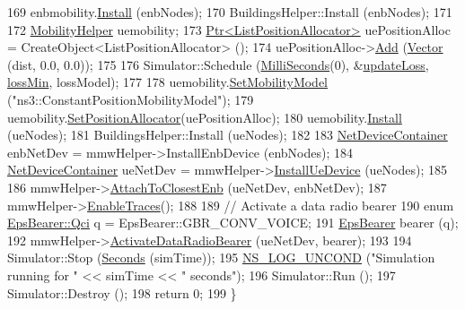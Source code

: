 \begin{DoxyCode}
169   enbmobility.\hyperlink{classns3_1_1MobilityHelper_a07737960ee95c0777109cf2994dd97ae}{Install} (enbNodes);
170   BuildingsHelper::Install (enbNodes);
171 
172   \hyperlink{classns3_1_1MobilityHelper}{MobilityHelper} uemobility;
173   \hyperlink{classns3_1_1Ptr}{Ptr<ListPositionAllocator>} uePositionAlloc = 
      CreateObject<ListPositionAllocator> ();
174   uePositionAlloc->\hyperlink{classns3_1_1ListPositionAllocator_a460e82f015ac012a73ba0ea0cccb3486}{Add} (\hyperlink{classns3_1_1Vector3D_a7e59b47bc94c9cb1dadff68c1d0112d8}{Vector} (dist, 0.0, 0.0));
175 
176   Simulator::Schedule (\hyperlink{group__timecivil_gaf26127cf4571146b83a92ee18679c7a9}{MilliSeconds}(0), &\hyperlink{mmwave-amc-test2_8cc_adfea4867a62217f5e5e9a8ff5e69a5ad}{updateLoss}, 
      \hyperlink{mmwave-amc-test2_8cc_a9ca00a53092f2e9430cb7f39c9831c11}{lossMin}, lossModel);
177 
178   uemobility.\hyperlink{classns3_1_1MobilityHelper_a030275011b6f40682e70534d30280aba}{SetMobilityModel} (\textcolor{stringliteral}{"ns3::ConstantPositionMobilityModel"});
179   uemobility.\hyperlink{classns3_1_1MobilityHelper_ac59d5295076be3cc11021566713a28c5}{SetPositionAllocator}(uePositionAlloc);
180   uemobility.\hyperlink{classns3_1_1MobilityHelper_a07737960ee95c0777109cf2994dd97ae}{Install} (ueNodes);
181   BuildingsHelper::Install (ueNodes);
182 
183   \hyperlink{classns3_1_1NetDeviceContainer}{NetDeviceContainer} enbNetDev = mmwHelper->InstallEnbDevice (enbNodes);
184   \hyperlink{classns3_1_1NetDeviceContainer}{NetDeviceContainer} ueNetDev = mmwHelper->\hyperlink{classns3_1_1MmWaveHelper_a9311c819d7ee539c8710c5b7e98df37a}{InstallUeDevice} (ueNodes);
185 
186   mmwHelper->\hyperlink{classns3_1_1MmWaveHelper_a202baea67b0af0d4fb6069de73766dc6}{AttachToClosestEnb} (ueNetDev, enbNetDev);
187   mmwHelper->\hyperlink{classns3_1_1MmWaveHelper_a4eae3871876b62965d612d9a56ed21bc}{EnableTraces}();
188 
189   \textcolor{comment}{// Activate a data radio bearer}
190   \textcolor{keyword}{enum} \hyperlink{structns3_1_1EpsBearer_aecf0c67109c5eb4ec0b07226fff5885e}{EpsBearer::Qci} q = EpsBearer::GBR\_CONV\_VOICE;
191   \hyperlink{structns3_1_1EpsBearer}{EpsBearer} bearer (q);
192   mmwHelper->\hyperlink{classns3_1_1MmWaveHelper_a9178ae3493484a9582039bb14edb282a}{ActivateDataRadioBearer} (ueNetDev, bearer);
193 
194   Simulator::Stop (\hyperlink{group__timecivil_ga33c34b816f8ff6628e33d5c8e9713b9e}{Seconds} (simTime));
195         \hyperlink{log-macros-disabled_8h_a0b36e5e182b37194f85ef1c5e979fb2e}{NS\_LOG\_UNCOND} (\textcolor{stringliteral}{"Simulation running for "} << simTime << \textcolor{stringliteral}{" seconds"});
196   Simulator::Run ();
197   Simulator::Destroy ();
198   \textcolor{keywordflow}{return} 0;
199 \}
\end{DoxyCode}


